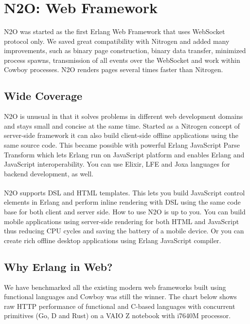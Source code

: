 \section{N2O: Web Framework}

\paragraph{}
N2O was started as the first Erlang Web Framework
that uses WebSocket protocol only. We saved great compatibility with Nitrogen
and added many improvements, such as binary page construction,
binary data transfer, minimized process spawns, transmission of all events over the WebSocket
and work within Cowboy processes. N2O renders pages several times faster than Nitrogen.

\subsection{Wide Coverage}
N2O is unusual in that it solves problems in different web development domains
and stays small and concise at the same time. Started as a Nitrogen concept
of server-side framework it can also build client-side offline applications
using the same source code. This became possible with powerful Erlang JavaScript Parse
Transform which lets Erlang run on JavaScript platform and enables Erlang and JavaScript
interoperability. You can use Elixir, LFE and Joxa languages for backend development, as well.

\paragraph{}
N2O supports DSL and HTML templates. This lets you build JavaScript
control elements in Erlang and perform inline rendering with DSL using
the same code base for both client and server side.
How to use N2O is up to you. You can build mobile applications using server-side rendering
for both HTML and JavaScript thus reducing CPU cycles and saving the battery of a mobile device.
Or you can create rich offline desktop applications using Erlang JavaScript compiler.

\newpage
\subsection*{Why Erlang in Web?}
We have benchmarked all the existing modern web frameworks built using functional
languages and Cowboy was still the winner. The chart below shows raw HTTP
performance of functional and C-based languages with concurrent
primitives (Go, D and Rust) on a VAIO Z notebook with i7640M processor.

